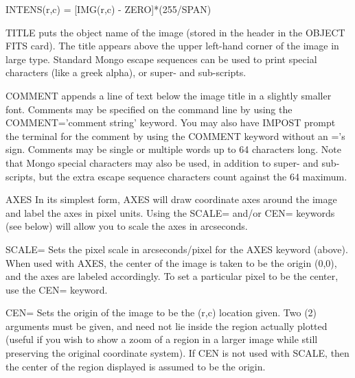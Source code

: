 {\newpage\clearpage
{}%
\begin{hanging}
  \item{          INTENS(r,c) = {[IMG(r,c) - ZERO]}*(255/SPAN)}
\end{hanging}%
\lthtmlfigureZ
\lthtmlcheckvsize\clearpage}

{\newpage\clearpage
{}%
\begin{example}
  \item[TITLE]{puts the object name of the image (stored in the header in
          the OBJECT FITS card).  The title appears above the upper
          left-hand corner of the image in large type.  Standard 
          Mongo escape sequences can be used to print special characters
          (like a greek alpha), or super- and sub-scripts.}
  \item[COMMENT]{appends a line of text below the image title in a slightly
          smaller font.  Comments may be specified on the command line
          by using the COMMENT='comment string' keyword.  You may also
          have IMPOST prompt the terminal for the comment by using
          the COMMENT keyword without an ='s sign.  Comments may be 
          single or multiple words up to 64 characters long.  Note that
          Mongo special characters may also be used, in addition to 
          super- and sub-scripts, but the extra escape sequence characters
          count against the 64 maximum.}
  \item[AXES]{In its simplest form, AXES will draw coordinate axes around
          the image and label the axes in pixel units.  Using the
          SCALE= and/or CEN= keywords (see below) will allow you
          to scale the axes in arcseconds.}
  \item[SCALE= ]{Sets the pixel scale in arcseconds/pixel for the AXES 
          keyword (above).  When used with AXES, the center of
          the image is taken to be the origin (0,0), and the axes
          are labeled accordingly.  To set a particular pixel to be
          the center, use the CEN= keyword.}
  \item[CEN=]{Sets the origin of the image to be the (r,c) location given.
          Two (2) arguments must be given, and need not lie inside the
          region actually plotted (useful if you wish to show a zoom of
          a region in a larger image while still preserving the original
          coordinate system).  If CEN is not used with SCALE, then the
          center of the region displayed is assumed to be the origin.
}
\end{example}}
